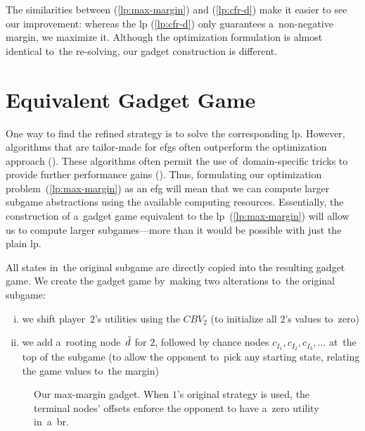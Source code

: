 The similarities between (\ref{lp:max-margin}) and (\ref{lp:cfr-d}) make it easier to see our improvement:
whereas the \acrshort{lp} (\ref{lp:cfr-d}) only guarantees a~non-negative margin, we maximize it.
Although the optimization formulation is almost identical to~the re-solving, our gadget construction is different.

\section{Equivalent Gadget Game}
One way to find the refined strategy is to solve the corresponding \acrfull{lp}.
However, algorithms that are tailor-made for \acrshort{efg}s often outperform the optimization approach (\cite{Bosansky2013solving}).
These algorithms often permit the use of~domain-specific tricks to provide further performance gains (\cite{Johanson2012efficient}).
Thus, formulating our optimization problem~(\ref{lp:max-margin}) as an \acrshort{efg} will mean that we can compute larger subgame abstractions using the available computing resources.
Essentially, the construction of a~gadget game equivalent to the \acrshort{lp}~(\ref{lp:max-margin}) will allow us to compute larger subgames---more than it would be possible with just the plain \acrshort{lp}.

All states in~the original subgame are directly copied into the resulting gadget game.
We create the gadget game by~making two alterations to~the original subgame:
\begin{enumerate}[(i)]
  \item we shift player~$2$'s utilities using the $CBV_2$ (to initialize all $2$'s values to~zero)
  \item we add a~rooting node~$\tilde{d}$ for $2$, followed by chance nodes $c_{I_1}, c_{I_2}, c_{I_3}, \dots$ at~the top of the subgame (to allow the opponent to~pick any starting state, relating the game values to~the margin)
\end{enumerate}

\begin{figure}[H]
  \centering
  \def\svgwidth{.4\textwidth}
  
  \def\captionTitle{Our max-margin gadget}
  \caption[\captionTitle]{\captionTitle. When $1$'s original strategy is used, the terminal nodes' offsets enforce the opponent to have a~zero utility in~a~\acrshort{br}.}
  \label{fig:max-margin-gadget}
\end{figure}

